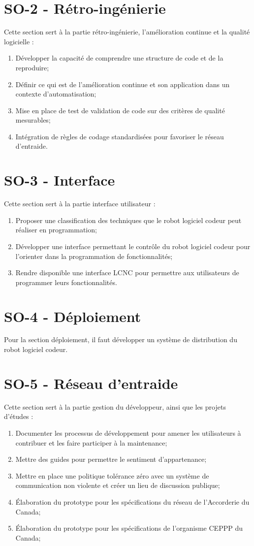 \section{SO-2 - Rétro-ingénierie}
Cette section sert à la partie rétro-ingénierie, l'amélioration continue et la qualité logicielle :
\begin{enumerate}
    \item Développer la capacité de comprendre une structure de code et de la reproduire;
    \item Définir ce qui est de l’amélioration continue et son application dans un contexte d’automatisation;
    \item Mise en place de test de validation de code sur des critères de qualité mesurables;
    \item Intégration de règles de codage standardisées pour favoriser le réseau d’entraide.
\end{enumerate}

\section{SO-3 - Interface}
Cette section sert à la partie interface utilisateur :
\begin{enumerate}
    \item Proposer une classification des techniques que le robot logiciel codeur peut réaliser en programmation;
    \item Développer une interface permettant le contrôle du robot logiciel codeur pour l’orienter dans la programmation de fonctionnalités;
    \item Rendre disponible une interface LCNC pour permettre aux utilisateurs de programmer leurs fonctionnalités.
\end{enumerate}

\section{SO-4 - Déploiement}
Pour la section déploiement, il faut développer un système de distribution du robot logiciel codeur.

\section{SO-5 - Réseau d’entraide}
Cette section sert à la partie gestion du développeur, ainsi que les projets d'études :
\begin{enumerate}
    \item Documenter les processus de développement pour amener les utilisateurs à contribuer et les faire participer à la maintenance;
    \item Mettre des guides pour permettre le sentiment d'appartenance;
    \item Mettre en place une politique tolérance zéro avec un système de communication non violente et créer un lieu de discussion publique;
    \item Élaboration du prototype pour les spécifications du réseau de l’Accorderie du Canada;
    \item Élaboration du prototype pour les spécifications de l’organisme CEPPP du Canada;
\end{enumerate}

